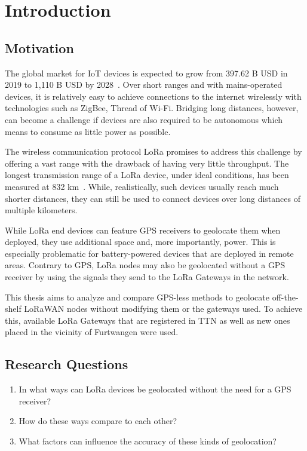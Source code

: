 \chapter{Introduction}

\section{Motivation}

The global market for \ac{IoT} devices is expected to grow from 397.62 B USD in 2019 to 1,110 B USD by 2028~\cite{grand_view_research_global_2022}.
Over short ranges and with mains-operated devices, it is relatively easy to achieve connections to the internet wirelessly with technologies such as ZigBee, Thread of Wi-Fi.
Bridging long distances, however, can become a challenge if devices are also required to be autonomous which means to consume as little power as possible.

The wireless communication protocol \ac{LoRa} promises to address this challenge by offering a vast range with the drawback of having very little throughput.
The longest transmission range of a \ac{LoRa} device, under ideal conditions, has been measured at 832 km~\cite{the_things_network_global_team_lora_nodate}.
While, realistically, such devices usually reach much shorter distances, they can still be used to connect devices over long distances of multiple kilometers.

While \ac{LoRa} end devices can feature \ac{GPS} receivers to geolocate them when deployed, they use additional space and, more importantly, power.
This is especially problematic for battery-powered devices that are deployed in remote areas.
Contrary to \ac{GPS}, \ac{LoRa} nodes may also be geolocated without a \ac{GPS} receiver by using the signals they send to the \ac{LoRa} Gateways in the network.

This thesis aims to analyze and compare \ac{GPS}-less methods to geolocate off-the-shelf \ac{LoRaWAN} nodes without modifying them or the gateways used.
To achieve this, available \ac{LoRa} Gateways that are registered in \acf{TTN} as well as new ones placed in the vicinity of Furtwangen were used. 

\section{Research Questions}

\begin{enumerate}
      \item In what ways can \ac{LoRa} devices be geolocated without the need for a \ac{GPS} receiver?
      \item How do these ways compare to each other?
      \item What factors can influence the accuracy of these kinds of geolocation?
\end{enumerate}

